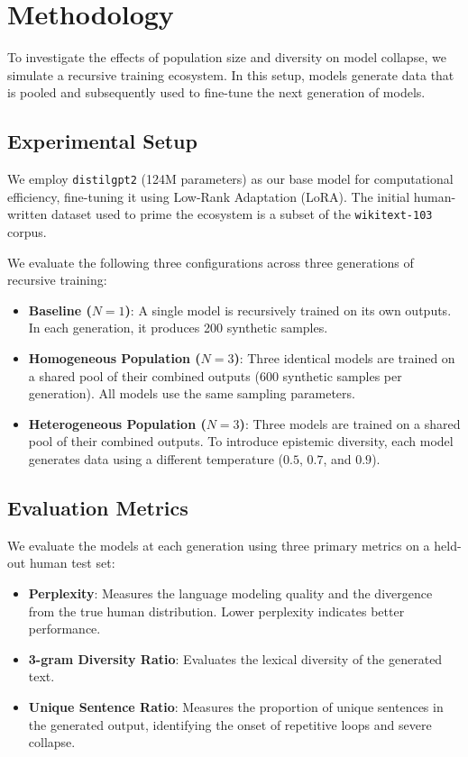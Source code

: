 \section{Methodology}
\label{sec:method}

To investigate the effects of population size and diversity on model collapse, we simulate a recursive training ecosystem. In this setup, models generate data that is pooled and subsequently used to fine-tune the next generation of models.

\subsection{Experimental Setup}
\label{sec:method_setup}

 We employ \texttt{distilgpt2} (124M parameters) as our base model for computational efficiency, fine-tuning it using Low-Rank Adaptation (LoRA). The initial human-written dataset used to prime the ecosystem is a subset of the \texttt{wikitext-103} corpus.

 We evaluate the following three configurations across three generations of recursive training:
\begin{itemize}[leftmargin=*,itemsep=0pt,topsep=0pt]
    \item \textbf{Baseline ($N=1$)}: A single model is recursively trained on its own outputs. In each generation, it produces 200 synthetic samples.
    \item \textbf{Homogeneous Population ($N=3$)}: Three identical models are trained on a shared pool of their combined outputs (600 synthetic samples per generation). All models use the same sampling parameters.
    \item \textbf{Heterogeneous Population ($N=3$)}: Three models are trained on a shared pool of their combined outputs. To introduce epistemic diversity, each model generates data using a different temperature ($0.5$, $0.7$, and $0.9$).
\end{itemize}

\subsection{Evaluation Metrics}
\label{sec:method_metrics}

We evaluate the models at each generation using three primary metrics on a held-out human test set:
\begin{itemize}[leftmargin=*,itemsep=0pt,topsep=0pt]
    \item \textbf{Perplexity}: Measures the language modeling quality and the divergence from the true human distribution. Lower perplexity indicates better performance.
    \item \textbf{3-gram Diversity Ratio}: Evaluates the lexical diversity of the generated text.
    \item \textbf{Unique Sentence Ratio}: Measures the proportion of unique sentences in the generated output, identifying the onset of repetitive loops and severe collapse.
\end{itemize}

